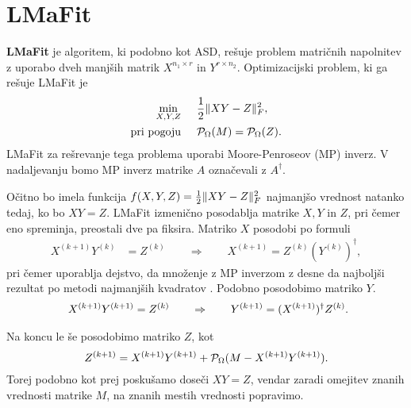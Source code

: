 \section{LMaFit} \label{2807-1447}
\textbf{LMaFit} \cite{LMaFit-WY12} je algoritem, ki podobno kot ASD, rešuje problem matričnih napolnitev z uporabo dveh manjših matrik $X^{n_1 \times r}$ in $Y^{r \times n_2}$.
Optimizacijski problem, ki ga rešuje LMaFit je
\begin{align*}
    \min_{X, Y, Z}& \hspace{0.5cm} \frac{1}{2}\lVert XY - Z\rVert_F^2,\\
    \text{pri pogoju}& \hspace{0.5cm} \mathcal{P}_\Omega(M) = \mathcal{P}_\Omega(Z).
\end{align*}
LMaFit za rešrevanje tega problema uporabi
Moore-Penroseov (MP) inverz. V nadaljevanju bomo MP inverz matrike $A$ označevali z $A^\dagger$.

Očitno bo imela funkcija $f(X,Y,Z) = \frac{1}{2}\lVert XY - Z\rVert_F^2$ najmanjšo vrednost natanko tedaj, ko bo $XY = Z$. 
LMaFit izmenično posodablja matrike $X, Y$ in $Z$, pri čemer eno spreminja, preostali dve pa fiksira. Matriko $X$ posodobi po formuli
\begin{align*}
    X^{(k+1)}Y^{(k)}&= Z^{(k)}
    \qquad 
    \Rightarrow
    \qquad
    X^{(k+1)} = Z^{(k)}(Y^{(k)})^\dagger,
\end{align*}
pri čemer uporablja dejstvo, da množenje z MP inverzom z desne 
da najboljši rezultat po metodi najmanjših kvadratov \cite[pogl. 3]{demmel97}.
Podobno posodobimo matriko $Y$.
\begin{align*}
    \hspace{0.5cm} X^{(k+1)}Y^{(k+1)} &= Z^{(k)}    \qquad 
    \Rightarrow
    \qquad
    Y^{(k+1)} = (X^{(k+1)})^\dagger Z^{(k)}.
\end{align*}

Na koncu le še posodobimo matriko $Z$, kot
\[
    Z^{(k+1)} = X^{(k+1)}Y^{(k+1)} + \mathcal{P}_\Omega(M - X^{(k+1)}Y^{(k+1)}).
\]
Torej podobno kot prej poskušamo doseči $XY = Z$, vendar zaradi omejitev znanih vrednosti matrike $M$, na znanih mestih vrednosti popravimo.
